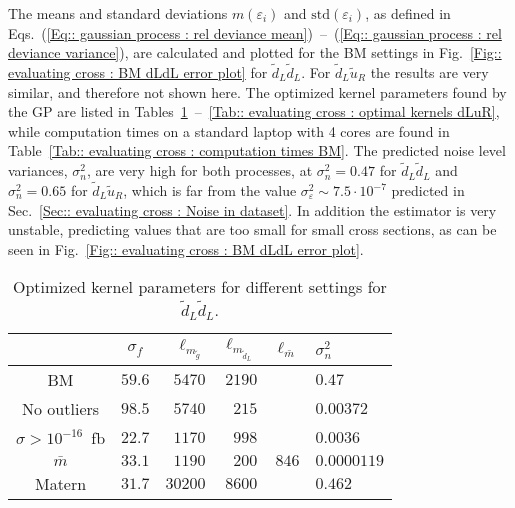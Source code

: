 \documentclass[twoside,english]{uiofysmaster}
\begin{document}
{The means and standard deviations $m(\varepsilon_i)$ and $\text{std}(\varepsilon_i)$, as defined in Eqs.~(\ref{Eq:: gaussian process : rel deviance mean})~--~(\ref{Eq:: gaussian process : rel deviance variance}), are calculated  and plotted for the BM settings in Fig.~\ref{Fig:: evaluating cross : BM dLdL error plot} for $\widetilde{d}_L \widetilde{d}_L$. For $\widetilde{d}_L \widetilde{u}_R$  the results are very similar, and therefore not shown here. The optimized kernel parameters found by the GP are listed in Tables~\ref{Tab:: evaluating cross : optimal kernels dLdL}~--~\ref{Tab:: evaluating cross : optimal kernels dLuR}, while computation times on a standard laptop with 4 cores are found in Table~\ref{Tab:: evaluating cross : computation times BM}. The predicted noise level variances, $\sigma_n^2$, are very high for both processes, at $\sigma_n^2=0.47$ for $\widetilde{d}_L \widetilde{d}_L$ and $\sigma_n^2=0.65$ for $\widetilde{d}_L \widetilde{u}_R$, which is far from the value $\sigma_{\varepsilon}^2 \sim 7.5 \cdot 10^{-7}$ predicted in Sec.~\ref{Sec:: evaluating cross : Noise in dataset}. In addition the estimator is very unstable, predicting values that are too small for small cross sections, as can be seen in Fig.~\ref{Fig:: evaluating cross : BM dLdL error plot}.

\begin{table}
\centering
\begin{tabular}{@{}ccrrrl@{}} \toprule
 & $\sigma_f$ & $\ell_{m_{\widetilde{g}}}$ & $\ell_{m_{\widetilde{d}_L}}$ & $\ell_{\bar{m}}$ & $\sigma_n^2$\\ \midrule
BM & $59.6$ & $5470 $& $ 2190$ & & $0.47$\\
No outliers & $98.5$ & $5740$ & $215$ & & $0.00372$\\
$\sigma > 10^{-16}$~fb & $22.7$ & $1170$&  $998$ && $0.0036$\\
$\bar{m}$ & $33.1$ & $1190$ & $200$ & $846$ & $0.0000119$\\
Matern & $31.7$ & $30200$ & $8600$ && $0.462$\\ \bottomrule
\end{tabular}
\caption{Optimized kernel parameters for different settings for $\widetilde{d}_L \widetilde{d}_L$.}
\label{Tab:: evaluating cross : optimal kernels dLdL}
\end{table}


}
\end{document}
